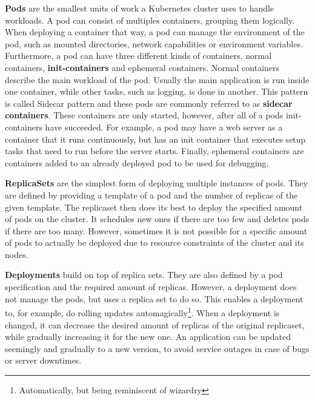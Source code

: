 \textbf{Pods}\cite{kubernetes-pods} are the smallest units of work a Kubernetes cluster uses to handle workloads.
A pod can consist of multiples containers, grouping them logically.
When deploying a container that way, a pod can manage the environment of the pod, such as mounted directories, network capabilities or environment variables.
Furthermore, a pod can have three different kinds of containers, normal containers, \textbf{init-containers} and ephemeral containers.
Normal containers describe the main workload of the pod.
Usually the main application is run inside one container, while other tasks, such as logging, is done in another.
This pattern is called Sidecar pattern and these pods are commonly referred to as \textbf{sidecar containers}\cite{sidecar-container}.
These containers are only started, however, after all of a pods init-containers have succeeded.
For example, a pod may have a web server as a container that it runs continuously, but has an init container that executes setup tasks that need to run before the server starts.
Finally, ephemeral containers are containers added to an already deployed pod to be used for debugging.

\textbf{ReplicaSets}\cite{kubernetes-replicaset} are the simplest form of deploying multiple instances of pods.
They are defined by providing a template of a pod and the number of replicas of the given template.
The replicaset then does its best to deploy the specified amount of pods on the cluster.
It schedules new ones if there are too few and deletes pods if there are too many.
However, sometimes it is not possible for a specific amount of pods to actually be deployed due to resource constraints of the cluster and its nodes.

\textbf{Deployments}\cite{kubernetes-deployments} build on top of replica sets.
They are also defined by a pod specification and the required amount of replicas.
However, a deployment does not manage the pods, but uses a replica set to do so.
This enables a deployment to, for example, do rolling updates automagically\footnote{Automatically, but being reminiscent of wizardry}.
When a deployment is changed, it can decrease the desired amount of replicas of the original replicaset, while gradually increasing it for the new one.
An application can be updated seemingly and gradually to a new version, to avoid service outages in case of bugs or server downtimes.

